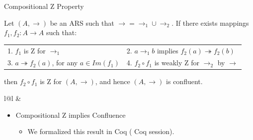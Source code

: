 \documentclass[10pt]{beamer}
\newcommand{\tto}{\twoheadrightarrow}
\begin{document}
\begin{frame}[fragile]{Compositional Z Property}
  \begin{definition}\label{def:zcomp}
  Let $(A,\to)$ be an ARS such that $\to = \to_1 \cup \to_2$. If there exists mappings $f_1,f_2: A \to A$ such that: \\[.05in]
  \begin{tabular}{ll}
  {\color{blue} 1.} $f_1$ is Z for $\to_1$ & {\color{blue} 2.} $a \to_1 b$ implies $f_2(a) \tto f_2(b)$ \\[.05in]
  {\color{blue} 3.} $a \tto f_2(a)$, for any $a\in Im(f_1)$ & {\color{blue} 4.} $f_2 \circ f_1$ is weakly Z for $\to_2$ by $\to$ \\[.05in]
  \end{tabular}
  then $f_2 \circ f_1$ is Z for $(A,\to)$, and hence $(A,\to)$
  is confluent.
  \begin{tabular}{l@{\hskip 1cm}l}
   &
\end{tabular}
\end{definition}
  \begin{itemize}
  \item Compositional Z implies Confluence~\cite{Nakazawa-Fujita2016}
    \begin{itemize}
    \item We formalized this result in Coq ({\color{blue} Coq session}).
    \end{itemize}
  \end{itemize}
\end{frame}
\end{document}
